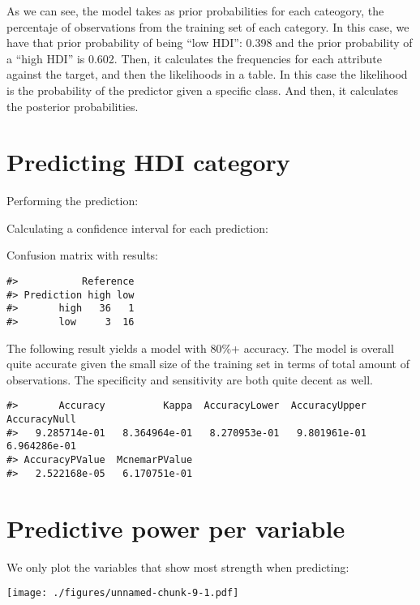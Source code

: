 \documentclass[]{article}
\begin{document}
As we can see, the model takes as prior probabilities for each
cateogory, the percentaje of observations from the training set of each
category. In this case, we have that prior probability of being ``low
HDI'': 0.398 and the prior probability of a ``high HDI'' is 0.602. Then,
it calculates the frequencies for each attribute against the target, and
then the likelihoods in a table. In this case the likelihood is the
probability of the predictor given a specific class. And then, it
calculates the posterior probabilities.

\hypertarget{predicting-hdi-category}{%
\section{Predicting HDI category}\label{predicting-hdi-category}}

Performing the prediction:

Calculating a confidence interval for each prediction:

Confusion matrix with results:

\tiny

\begin{verbatim}
#>           Reference
#> Prediction high low
#>       high   36   1
#>       low     3  16
\end{verbatim}

\normalsize

The following result yields a model with 80\%+ accuracy. The model is
overall quite accurate given the small size of the training set in terms
of total amount of observations. The specificity and sensitivity are
both quite decent as well.

\begin{verbatim}
#>       Accuracy          Kappa  AccuracyLower  AccuracyUpper   AccuracyNull 
#>   9.285714e-01   8.364964e-01   8.270953e-01   9.801961e-01   6.964286e-01 
#> AccuracyPValue  McnemarPValue 
#>   2.522168e-05   6.170751e-01
\end{verbatim}

\newpage

\hypertarget{predictive-power-per-variable}{%
\section{Predictive power per
variable}\label{predictive-power-per-variable}}

We only plot the variables that show most strength when predicting:

\texttt{[image: ./figures/unnamed-chunk-9-1.pdf]}
\end{document}

